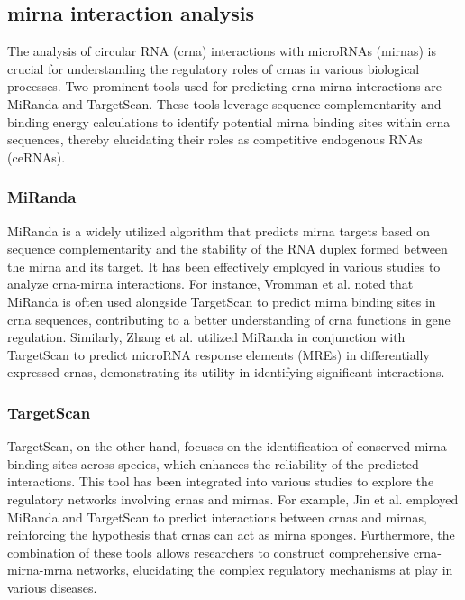 \subsection{\gls{mirna} interaction analysis}
The analysis of circular RNA (\gls{crna}) interactions with microRNAs (\gls{mirna}s)
is crucial for understanding the regulatory roles of \gls{crna}s in various
biological processes.
Two prominent tools used for predicting \gls{crna}-\gls{mirna} interactions are
MiRanda and TargetScan.
These tools leverage sequence complementarity and binding energy calculations
to identify potential \gls{mirna} binding sites within \gls{crna} sequences, thereby
elucidating their roles as competitive endogenous RNAs (ceRNAs).

\subsubsection{MiRanda}
MiRanda is a widely utilized algorithm that predicts \gls{mirna} targets based on
sequence complementarity and the stability of the RNA duplex formed between the
\gls{mirna} and its target.
It has been effectively employed in various studies to analyze \gls{crna}-\gls{mirna}
interactions.
For instance, Vromman et al.
noted that
MiRanda is often used alongside TargetScan to predict \gls{mirna} binding sites in
\gls{crna} sequences, contributing to a better understanding of \gls{crna}
functions
in gene regulation\supercite{vromman_closing_2021}.
Similarly, Zhang et al.
utilized
MiRanda in conjunction with TargetScan to predict microRNA response elements
(MREs) in differentially expressed \gls{crna}s, demonstrating its utility in
identifying significant interactions\supercite{zhang_microarray_2017}.

\subsubsection{TargetScan}
TargetScan, on the other hand, focuses on the identification of conserved \gls{mirna}
binding sites across species, which enhances the reliability of the predicted
interactions.
This tool has been integrated into various studies to explore the regulatory
networks involving \gls{crna}s and \gls{mirna}s.
For example, Jin et al.
employed MiRanda and TargetScan to predict interactions between \gls{crna}s and
\gls{mirna}s, reinforcing the hypothesis that \gls{crna}s can act as \gls{mirna}
sponges\supercite{jin_changes_2018}.
Furthermore, the combination of these tools allows researchers to construct
comprehensive \gls{crna}-\gls{mirna}-\gls{mrna} networks, elucidating the complex
regulatory mechanisms at play in various
diseases\supercite{he_construction_2021,zhang_construction_2021}.
